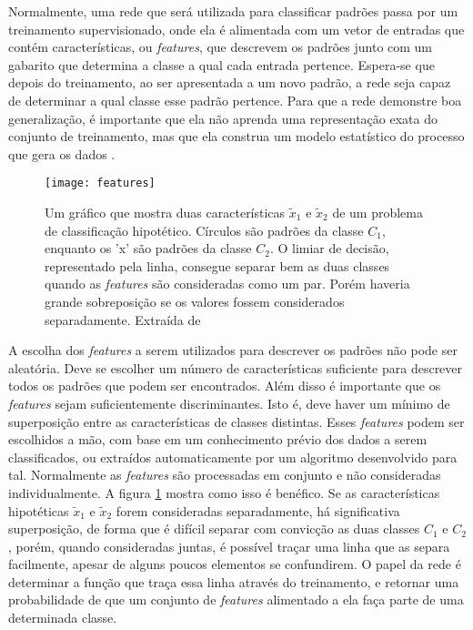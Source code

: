 Normalmente, uma rede que será utilizada para classificar padrões passa por um treinamento supervisionado, onde ela é alimentada com um vetor de entradas que contém características, ou \textit{features}, que descrevem os padrões junto com um gabarito que determina a classe a qual cada entrada pertence. Espera-se que depois do treinamento, ao ser apresentada a um novo padrão, a rede seja capaz de determinar a qual classe esse padrão pertence. Para que a rede demonstre boa generalização, é importante que ela não aprenda uma representação exata do conjunto de treinamento, mas que ela construa um modelo estatístico do processo que gera os dados \cite{NNForPR}.

\begin{figure}[!ht]
\centering
\texttt{[image: features]}
\label{fig:features}
\caption{Um gráfico que mostra duas características $\tilde{x}_1$ e $\tilde{x}_2$ de um problema de classificação hipotético. Círculos são padrões da classe $C_1$, enquanto os 'x' são padrões da classe $C_2$. O limiar de decisão, representado pela linha, consegue separar bem as duas classes quando as \textit{features} são consideradas como um par. Porém haveria grande sobreposição se os valores fossem considerados separadamente. Extraída de \cite{NNForPR}}
\end{figure}

A escolha dos \textit{features} a serem utilizados para descrever os padrões não pode ser aleatória. Deve se escolher um número de características suficiente para descrever todos os padrões que podem ser encontrados. Além disso é importante que os \textit{features} sejam suficientemente discriminantes. Isto é, deve haver um mínimo de superposição entre as características de classes distintas. Esses \textit{features} podem ser escolhidos a mão, com base em um conhecimento prévio dos dados a serem classificados, ou extraídos automaticamente por um algoritmo desenvolvido para tal. Normalmente as \textit{features} são processadas em conjunto e não consideradas individualmente. A figura \ref{fig:features} mostra como isso é benéfico. Se as características hipotéticas $\tilde{x}_1$ e $\tilde{x}_2$ forem consideradas separadamente, há significativa superposição, de forma que é difícil separar com convicção as duas classes $C_1$ e $C_2$, porém, quando consideradas juntas, é possível traçar uma linha que as separa facilmente, apesar de alguns poucos elementos se confundirem. O papel da rede é determinar a função que traça essa linha através do treinamento, e retornar uma probabilidade de que um conjunto de \textit{features} alimentado a ela faça parte de uma determinada classe.



